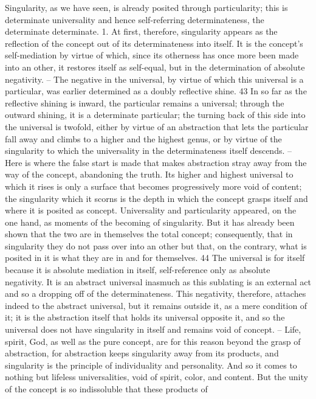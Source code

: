 Singularity, as we have seen, is already posited through particularity; this
is determinate universality and hence self-referring determinateness, the
determinate determinate.
1. At first, therefore, singularity appears as the reflection of the concept out
of its determinateness into itself. It is the concept’s self-mediation by virtue of
which, since its otherness has once more been made into an other, it restores
itself as self-equal, but in the determination of absolute negativity. – The
negative in the universal, by virtue of which this universal is a particular,
was earlier determined as a doubly reflective shine. 43 In so far as the reflective
shining is inward, the particular remains a universal; through the outward
shining, it is a determinate particular; the turning back of this side into the
universal is twofold, either by virtue of an abstraction that lets the particular
fall away and climbs to a higher and the highest genus, or by virtue of the
singularity to which the universality in the determinateness itself descends. –
Here is where the false start is made that makes abstraction stray away
from the way of the concept, abandoning the truth. Its higher and highest
universal to which it rises is only a surface that becomes progressively more
void of content; the singularity which it scorns is the depth in which the
concept grasps itself and where it is posited as concept.
Universality and particularity appeared, on the one hand, as moments of
the becoming of singularity. But it has already been shown that the two are
in themselves the total concept; consequently, that in singularity they do
not pass over into an other but that, on the contrary, what is posited in it is
what they are in and for themselves. 44 The universal is for itself because it
is absolute mediation in itself, self-reference only as absolute negativity. It
is an abstract universal inasmuch as this sublating is an external act and so
a dropping off of the determinateness. This negativity, therefore, attaches
indeed to the abstract universal, but it remains outside it, as a mere condition
of it; it is the abstraction itself that holds its universal opposite it, and so the
universal does not have singularity in itself and remains void of concept. –
Life, spirit, God, as well as the pure concept, are for this reason beyond
the grasp of abstraction, for abstraction keeps singularity away from its
products, and singularity is the principle of individuality and personality.
And so it comes to nothing but lifeless universalities, void of spirit, color,
and content.
But the unity of the concept is so indissoluble that these products of
